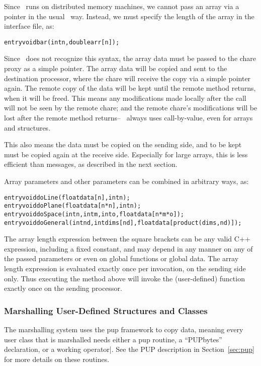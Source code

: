 Since \charmpp\ runs on distributed memory machines, we cannot
pass an array via a pointer in the usual \CC\ way.  Instead,
we must specify the length of the array in the interface file, as:
\begin{alltt}
  entry void bar(int n,double arr[n]);
\end{alltt}
Since \CC\ does not recognize this syntax, the array data
must be passed to the chare proxy as a simple pointer.
The array data will be copied and sent to the
destination processor, where the chare will receive the copy
via a simple pointer again.  The remote copy of the data
will be kept until the remote method returns, when
it will be freed.  
This means any modifications made locally after the call will not be 
seen by the remote chare; and the remote chare's modifications
will be lost after the remote method returns-- \charmpp\ always 
uses call-by-value, even for arrays and structures.  

This also means the data must be copied on the sending 
side, and to be kept must be copied again 
at the receive side.  Especially for large arrays, this 
is less efficient than messages, as described in the next section.

Array parameters and other parameters can be combined in arbitrary ways, as:
\begin{alltt}
  entry void doLine(float data[n],int n);
  entry void doPlane(float data[n*n],int n);
  entry void doSpace(int n,int m,int o,float data[n*m*o]);
  entry void doGeneral(int nd,int dims[nd],float data[product(dims,nd)]);
\end{alltt}
The array length expression between the square brackets can be 
any valid C++ expression, including a fixed constant, and may depend 
in any manner on any of the passed
parameters or even on global functions or global data.  The array length 
expression is evaluated exactly once per invocation, on the sending side only.
Thus executing the  method above will invoke the 
(user-defined)  function exactly once on the sending
processor.

\subsubsection{Marshalling User-Defined Structures and Classes}

The marshalling system uses the pup framework to copy data,
meaning every user class that is marshalled needs either a
pup routine, a ``PUPbytes'' declaration, or a working operator|.
See the PUP description in Section~\ref{sec:pup} for more details 
on these routines.

